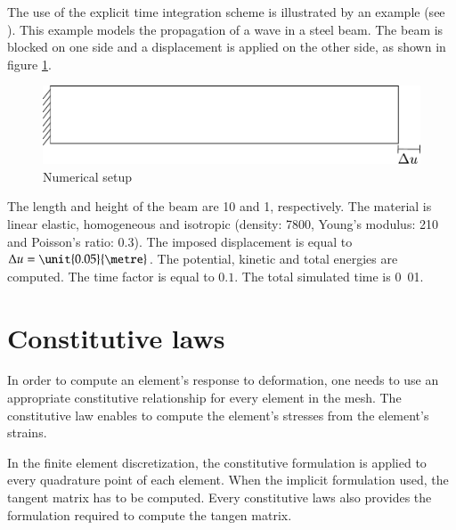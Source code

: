 The use  of the explicit  time integration scheme  is illustrated by  an example
(see  ).    This  example  models  the
propagation of  a wave in a  steel beam. The beam  is blocked on one  side and a
displacement   is   applied   on   the   other  side,   as   shown   in   figure
\ref{fig:smm:explicit}.

\begin{figure}[!htb]
  \centering
  \includegraphics[scale=.6]{figures/explicit_dynamic}
  \caption{Numerical setup \label{fig:smm:explicit}}
\end{figure}

The length  and height of  the beam are \unit{10}{\metre}  and \unit{1}{\metre},
respectively.   The  material  is  linear  elastic,  homogeneous  and  isotropic
(density:       \unit{7800}{\kilogrampercubicmetre},       Young's      modulus:
\unit{210}{\giga\pascal} and Poisson's  ratio: $0.3$).  The imposed displacement
is equal to  $\Delta u = \unit{0.05}{\metre}$. The  potential, kinetic and
total  energies are  computed.  The  time factor  is equal  to $0.1$.  The total
simulated time is \unit{0.01}{\second}.

\section{Constitutive laws \label{sect:smm:CL}}
In order to compute an element's response to deformation, one needs to use an
appropriate constitutive relationship for every element in the mesh. The
constitutive law enables to compute the element's stresses from the element's
strains.

In the finite element discretization, the constitutive formulation is
applied to every quadrature point of each element. When the implicit formulation
used, the tangent matrix has to be computed. Every constitutive laws also provides
the formulation required to compute the tangen matrix.

